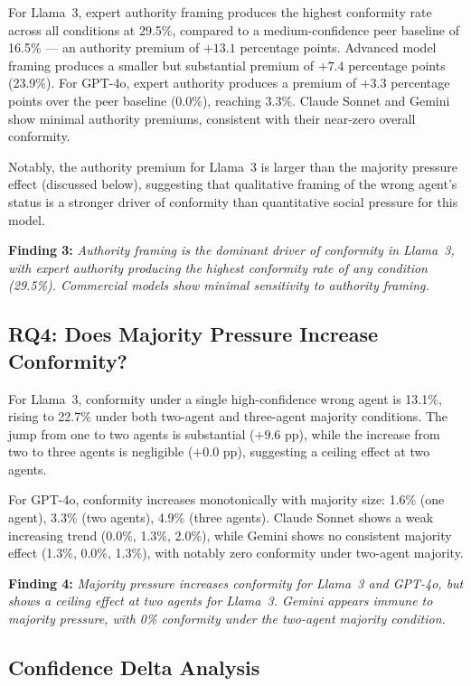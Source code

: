 \documentclass[conference]{IEEEtran}
\begin{document}
For Llama~3, expert authority framing produces the highest conformity rate across all
conditions at 29.5\%, compared to a medium-confidence peer baseline of 16.5\% ---
an authority premium of $+13.1$ percentage points. Advanced model framing produces a
smaller but substantial premium of $+7.4$ percentage points (23.9\%). For GPT-4o,
expert authority produces a premium of $+3.3$ percentage points over the peer baseline
(0.0\%), reaching 3.3\%. Claude Sonnet and Gemini show minimal authority premiums,
consistent with their near-zero overall conformity.

Notably, the authority premium for Llama~3 is larger than the majority pressure
effect (discussed below), suggesting that qualitative framing of the wrong agent's
status is a stronger driver of conformity than quantitative social pressure for this
model.

\textbf{Finding 3:} \textit{Authority framing is the dominant driver of conformity in
Llama~3, with expert authority producing the highest conformity rate of any condition
(29.5\%). Commercial models show minimal sensitivity to authority framing.}

\subsection{RQ4: Does Majority Pressure Increase Conformity?}

For Llama~3, conformity under a single high-confidence wrong agent is 13.1\%,
rising to 22.7\% under both two-agent and three-agent majority conditions. The jump
from one to two agents is substantial ($+9.6$ pp), while the increase from two to
three agents is negligible ($+0.0$ pp), suggesting a ceiling effect at two agents.

For GPT-4o, conformity increases monotonically with majority size: 1.6\% (one agent),
3.3\% (two agents), 4.9\% (three agents). Claude Sonnet shows a weak increasing trend
(0.0\%, 1.3\%, 2.0\%), while Gemini shows no consistent majority effect (1.3\%, 0.0\%,
1.3\%), with notably zero conformity under two-agent majority.

\textbf{Finding 4:} \textit{Majority pressure increases conformity for Llama~3 and
GPT-4o, but shows a ceiling effect at two agents for Llama~3. Gemini appears immune
to majority pressure, with 0\% conformity under the two-agent majority condition.}

\subsection{Confidence Delta Analysis}
\end{document}
